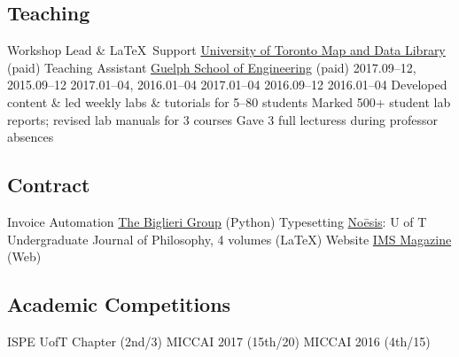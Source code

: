 \subsection{Teaching}
  {Workshop Lead \& \LaTeX\ Support}
  {\href{https://mdl.library.utoronto.ca}{University of Toronto Map and Data Library} (paid)}
  {Teaching Assistant}
  {\href{https://www.uoguelph.ca/engineering}{Guelph School of Engineering} (paid)}
     {2017.09--12, 2015.09--12}
       {2017.01--04, 2016.01--04}
     {2017.01--04}
              {2016.09--12}
   {2016.01--04}
  \bullet Developed content \& led weekly labs \& tutorials for 5--80 students
  \bullet Marked 500+ student lab reports; revised lab manuals for 3 courses
  \bullet Gave 3 full lecturess during professor absences
\subsection{Contract}
  {Invoice Automation} %
  {\href{https://www.thebiglierigroup.com}{The Biglieri Group} (Python)}
  {Typesetting} %
  {\href{https://www.noesisjournal.com}{No\={e}sis}: U of T Undergraduate Journal of Philosophy, 4 volumes (\LaTeX)}
  {Website} %
  {\href{https://www.imsmagazine.com}{IMS Magazine} (Web)}
\subsection{Academic Competitions}
  {}
  {ISPE UofT Chapter (2nd/3)}
  {}
  {MICCAI 2017 (15th/20)}
  {}
  {MICCAI 2016 (4th/15)}
\clearpage %
